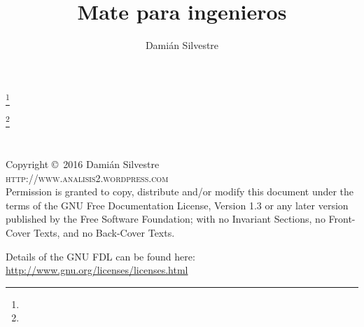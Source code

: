 \documentclass{amsbook}
\theoremstyle{definition}
\theoremstyle{remark}
\numberwithin{section}{chapter}
\numberwithin{equation}{chapter}
\begin{document}
\frontmatter

\title{Mate para ingenieros}


\author{Damián Silvestre}
\address{}
\curraddr{}
\email{}
\thanks{}

\author{}
\address{}
\curraddr{}
\email{}
\thanks{}





\maketitle


\newpage
~\vfill
\thispagestyle{empty}

\noindent Copyright \copyright\ 2016 Damián Silvestre\\ %


\noindent \textsc{http://www.analisis2.wordpress.com}\\ %

\noindent Permission is granted to copy, distribute and/or modify this document under the terms of the GNU Free Documentation License, Version 1.3 or any later version published by the Free Software Foundation; with no Invariant Sections, no Front-Cover Texts, and no Back-Cover Texts. 

\noindent Details of the GNU FDL can be found here: \url{http://www.gnu.org/licenses/licenses.html} \\ %

 


\end{document}
